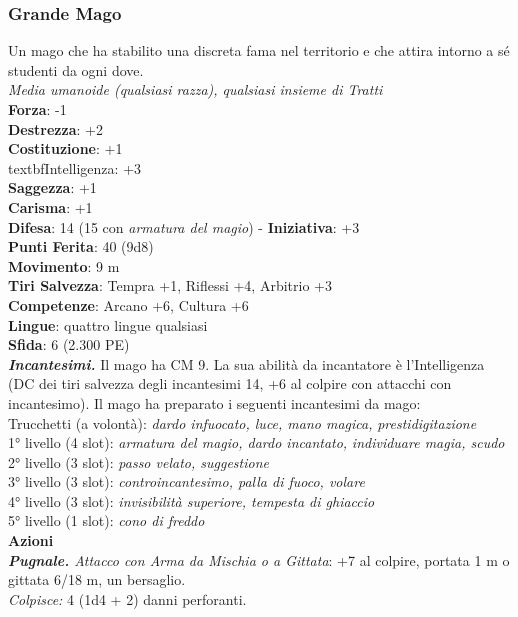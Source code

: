 \begin{multicols}{2}
\subsubsection{Grande Mago}
Un mago che ha stabilito una discreta fama nel territorio e che attira intorno a sé studenti da ogni dove.\\
\emph{Media umanoide (qualsiasi razza), qualsiasi insieme di Tratti}\\
\textbf{Forza}: -1\\
\textbf{Destrezza}: +2\\
\textbf{Costituzione}: +1\
\\textbf{Intelligenza}: +3\\
\textbf{Saggezza}: +1\\
\textbf{Carisma}: +1\\
\textbf{Difesa}: 14 (15 con \emph{armatura del magio}) - \textbf{Iniziativa}: +3\\
\textbf{Punti Ferita}: 40 (9d8)\\
\textbf{Movimento}: 9 m\\
\textbf{Tiri Salvezza}: Tempra +1, Riflessi +4, Arbitrio +3 \\
\textbf{Competenze}: Arcano +6, Cultura +6\\
\textbf{Lingue}: quattro lingue qualsiasi\\
\textbf{Sfida}: 6 (2.300 PE)\smallskip\\
\emph{\textbf{Incantesimi.}} Il mago ha CM 9. La sua abilità da incantatore è l'Intelligenza (DC dei tiri salvezza degli incantesimi 14, +6 al colpire con attacchi con incantesimo). Il mago ha preparato i seguenti incantesimi da mago:\\
Trucchetti (a volontà): \emph{dardo infuocato, luce, mano magica,} \emph{prestidigitazione}\\
1° livello (4 slot): \emph{armatura del magio, dardo incantato,} \emph{individuare magia, scudo}\\
2° livello (3 slot): \emph{passo velato, suggestione}\\
3° livello (3 slot): \emph{controincantesimo, palla di fuoco, volare}\\
4° livello (3 slot): \emph{invisibilità superiore, tempesta di ghiaccio}\\
5° livello (1 slot): \emph{cono di freddo}\\
\smallskip\textbf{Azioni}\\
\emph{\textbf{Pugnale.} Attacco con Arma da Mischia o a Gittata}: +7 al colpire, portata 1 m o gittata 6/18 m, un bersaglio.\\
\emph{Colpisce:} 4 (1d4 + 2) danni perforanti.


\end{multicols}
